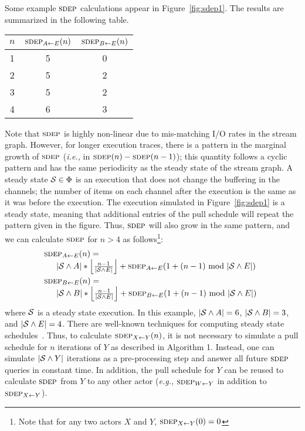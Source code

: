 Some example $\textsc{sdep}$ calculations appear in Figure~\ref{fig:sdep1}.
The results are summarized in the following table.
\begin{center}
\begin{tabular}{|c|c|c|}
\hline
$n$ & $\sdepf{A}{E}(n)$ & $\sdepf{B}{E}(n)$ \\
\hline \hline
1 & 5 & 0 \\ \hline
2 & 5 & 2 \\ \hline
3 & 5 & 2 \\ \hline
4 & 6 & 3 \\ \hline
\end{tabular}
\end{center}
Note that $\textsc{sdep}$ is highly non-linear due to mis-matching I/O rates
in the stream graph.  However, for longer execution traces, there is a
pattern in the marginal growth of $\textsc{sdep}$ ({\it i.e.,} in $\textsc{sdep}(n) -
\textsc{sdep}(n-1)$); this quantity follows a cyclic pattern and has the same
periodicity as the steady state of the stream graph.  A steady state
${\cal S} \in \Phi$ is an execution that does not change the buffering
in the channels; the number of items on each channel after the
execution is the same as it was before the execution.  The execution
simulated in Figure~\ref{fig:sdep1} is a steady state, meaning that
additional entries of the pull schedule will repeat the pattern given
in the figure.  Thus, $\textsc{sdep}$ will also grow in the same pattern, and
we can calculate $\textsc{sdep}$ for $n > 4$ as follows\footnote{Note that for
any two actors $X$ and $Y$, $\sdepf{X}{Y}(0) = 0$}:
\begin{equation*}
\begin{array}{l}
\mbox{} \hspace{-5pt} \sdepf{A}{E}(n) = \\ 
~~~|{\cal S} \wedge A| * \floor{n-1}{|{\cal S} \wedge E|} + \sdepf{A}{E}(1 + (n-1)~\mbox{mod}~|{\cal S} \wedge E|) \vspace{3pt} \\
\mbox{} \hspace{-5pt} \sdepf{B}{E}(n) = \\
~~~|{\cal S} \wedge B| * \floor{n-1}{|{\cal S} \wedge E|} + \sdepf{B}{E}(1 + (n-1)~\mbox{mod}~|{\cal S} \wedge E|)
\end{array}
\end{equation*}
where ${\cal S}$ is a steady state execution.  In this example,
$|{\cal S} \wedge A| = 6$, $|{\cal S} \wedge B| = 3$, and $|{\cal S}
\wedge E| = 4$.  There are well-known techniques for computing steady
state schedules~\cite{LM87-i}.  Thus, to calculate $\sdepf{X}{Y}(n)$,
it is not necessary to simulate a pull schedule for $n$ iterations of
$Y$ as described in Algorithm 1.  Instead, one can simulate $|{\cal S}
\wedge Y|$ iterations as a pre-processing step and answer all future
$\textsc{sdep}$ queries in constant time.  In addition, the pull schedule for
$Y$ can be reused to calculate $\textsc{sdep}$ from $Y$ to any other actor
({\it e.g.,} $\sdepf{W}{Y}$ in addition to $\sdepf{X}{Y}$).

